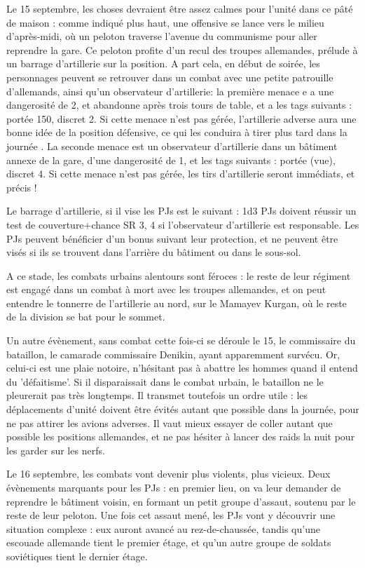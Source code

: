 \documentclass{report}
\begin{document}
\begin{multicols}{2}
Le 15 septembre, les choses devraient être assez calmes pour l'unité dans ce pâté de maison : comme indiqué plus haut, une offensive se lance vers le milieu d'après-midi, où un peloton traverse l'avenue du communisme pour aller reprendre la gare. Ce peloton profite d'un recul des troupes allemandes, prélude à un barrage d'artillerie sur la position. A part cela, en début de soirée, les personnages peuvent se retrouver dans un combat avec une petite patrouille d'allemands, ainsi qu'un observateur d'artillerie: la première menace e a une dangerosité de 2, et abandonne après trois tours de table, et a les tags suivants : portée 150, discret 2. Si cette menace n'est pas gérée, l'artillerie adverse aura une bonne idée de la position défensive, ce qui les conduira à tirer plus tard dans la journée . La seconde menace est un observateur d'artillerie dans un bâtiment annexe de la gare, d'une dangerosité de 1, et les tags suivants : portée (vue), discret 4. Si cette menace n'est pas gérée, les tirs d'artillerie seront immédiats, et précis !

Le barrage d'artillerie, si il vise les PJs est le suivant : 1d3 PJs doivent réussir un test de couverture+chance SR 3, 4 si l'observateur d'artillerie est responsable. Les PJs peuvent bénéficier d'un bonus suivant leur protection, et ne peuvent être visés si ils se trouvent dans l'arrière du bâtiment ou dans le sous-sol.

A ce stade, les combats urbains alentours sont féroces : le reste de leur régiment est engagé dans un combat à mort avec les troupes allemandes, et on peut entendre le tonnerre de l'artillerie au nord, sur le Mamayev Kurgan, où le reste de la division se bat pour le sommet.

Un autre évènement, sans combat cette fois-ci se déroule le 15, le commissaire du bataillon, le camarade commissaire Denikin, ayant apparemment survécu. Or, celui-ci est une plaie notoire, n'hésitant pas à abattre les hommes quand il entend du 'défaitisme'. Si il disparaissait dans le combat urbain, le bataillon ne le pleurerait pas très longtemps. Il transmet toutefois un ordre utile : les déplacements d'unité doivent être évités autant que possible dans la journée, pour ne pas attirer les avions adverses. Il vaut mieux essayer de coller autant que possible les positions allemandes, et ne pas hésiter à lancer des raids la nuit pour les garder sur les nerfs.

Le 16 septembre, les combats vont devenir plus violents, plus vicieux. Deux évènements marquants pour les PJs : en premier lieu, on va leur demander de reprendre le bâtiment voisin, en formant un petit groupe d'assaut, soutenu par le reste de leur peloton. Une fois cet assaut mené, les PJs vont y découvrir une situation complexe : eux auront avancé au rez-de-chaussée, tandis qu'une escouade allemande tient le premier étage, et qu'un autre groupe de soldats soviétiques tient le dernier étage.


\end{multicols}
\end{document}
